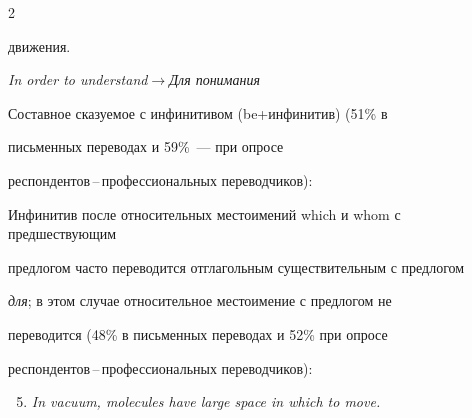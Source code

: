 \begin{multicols}{2}
\begin{enumerate}[(1)]
{движения.}





\textit{In order to understand}\;$\rightarrow$\;\textit{Для понимания }


\end{enumerate}





{\sf Составное сказуемое с инфинитивом (be\;+\;ин\-фи\-ни\-тив) (51\% в


письменных переводах и 59\%~--- при опросе


респондентов\,--\,профессиональных переводчиков):}










{\sf Инфинитив после относительных местоимений which и whom с предшествующим 


предлогом час\-то пе\-ре\-во\-дит\-ся отглагольным существительным с предлогом 


\textsl{для}; в этом случае относительное местоимение с предлогом не 


переводится (48\% в письменных переводах и 52\% при опросе 


рес\-пон\-ден\-тов\,--\,про\-фес\-сио\-наль\-ных переводчиков):}


\begin{enumerate}[(1)]


\setcounter{enumi}{4}


\item \textit{In vacuum, molecules have large space in which to move.}






\end{enumerate}
\end{multicols}
